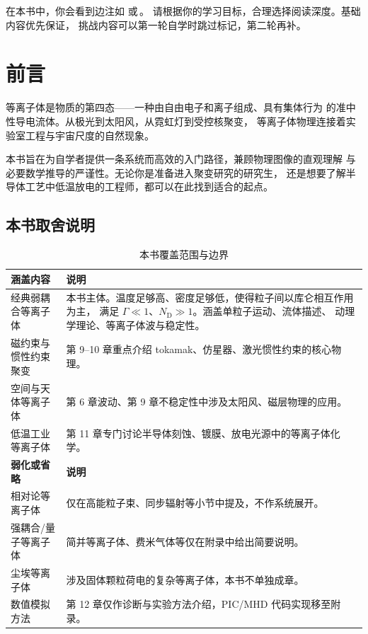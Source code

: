 \begin{miniquiz}
在本书中，你会看到边注如\,\,或\,。
请根据你的学习目标，合理选择阅读深度。基础内容优先保证，
挑战内容可以第一轮自学时跳过标记，第二轮再补。
\end{miniquiz}



\newpage
\chapter*{前言}

等离子体是物质的第四态——一种由自由电子和离子组成、具有集体行为
的准中性导电流体。从极光到太阳风，从霓虹灯到受控核聚变，
等离子体物理连接着实验室工程与宇宙尺度的自然现象。

本书旨在为自学者提供一条系统而高效的入门路径，兼顾物理图像的直观理解
与必要数学推导的严谨性。无论你是准备进入聚变研究的研究生，
还是想要了解半导体工艺中低温放电的工程师，都可以在此找到适合的起点。


\section*{本书取舍说明}

\begin{table}[htbp]
\centering
\caption{本书覆盖范围与边界}
\begin{tabular}{@{}lp{10cm}@{}}
\toprule
\textbf{涵盖内容} & \textbf{说明} \\
\midrule
经典弱耦合等离子体 & 本书主体。温度足够高、密度足够低，使得粒子间以库仑相互作用为主，
满足 $\Gamma\ll 1$、$N_\mathrm{D}\gg 1$。涵盖单粒子运动、流体描述、
动理学理论、等离子体波与稳定性。 \\
磁约束与惯性约束聚变 & 第 9--10 章重点介绍 tokamak、仿星器、激光惯性约束的核心物理。 \\
空间与天体等离子体 & 第 6 章波动、第 9 章不稳定性中涉及太阳风、磁层物理的应用。 \\
低温工业等离子体 & 第 11 章专门讨论半导体刻蚀、镀膜、放电光源中的等离子体化学。 \\
\midrule
\textbf{弱化或省略} & \textbf{说明} \\
\midrule
相对论等离子体 & 仅在高能粒子束、同步辐射等小节中提及，不作系统展开。 \\
强耦合/量子等离子体 & 简并等离子体、费米气体等仅在附录中给出简要说明。 \\
尘埃等离子体 & 涉及固体颗粒荷电的复杂等离子体，本书不单独成章。 \\
数值模拟方法 & 第 12 章仅作诊断与实验方法介绍，PIC/MHD 代码实现移至附录。 \\
\bottomrule
\end{tabular}
\end{table}

